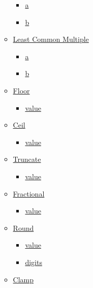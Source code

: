 \begin{itemize}
\begin{itemize}
    \begin{itemize}
    \tightlist
    \item
      \hyperref[functions-gcd-a]{a}
    \item
      \hyperref[functions-gcd-b]{b}
    \end{itemize}
  \item
    \hyperref[functions-lcm]{Least Common Multiple}

    \begin{itemize}
    \tightlist
    \item
      \hyperref[functions-lcm-a]{a}
    \item
      \hyperref[functions-lcm-b]{b}
    \end{itemize}
  \item
    \hyperref[functions-floor]{Floor}

    \begin{itemize}
    \tightlist
    \item
      \hyperref[functions-floor-value]{value}
    \end{itemize}
  \item
    \hyperref[functions-ceil]{Ceil}

    \begin{itemize}
    \tightlist
    \item
      \hyperref[functions-ceil-value]{value}
    \end{itemize}
  \item
    \hyperref[functions-trunc]{Truncate}

    \begin{itemize}
    \tightlist
    \item
      \hyperref[functions-trunc-value]{value}
    \end{itemize}
  \item
    \hyperref[functions-fract]{Fractional}

    \begin{itemize}
    \tightlist
    \item
      \hyperref[functions-fract-value]{value}
    \end{itemize}
  \item
    \hyperref[functions-round]{Round}

    \begin{itemize}
    \tightlist
    \item
      \hyperref[functions-round-value]{value}
    \item
      \hyperref[functions-round-digits]{digits}
    \end{itemize}
  \item
    \hyperref[functions-clamp]{Clamp}


\end{itemize}
\end{itemize}
